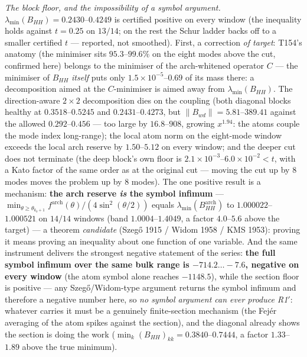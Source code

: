 \documentclass[11pt,a4paper]{article}
\begin{document}
\emph{The block floor, and the impossibility of a symbol argument.}
$\lambda_{\min}(B_{HH})=0.2430$--$0.4249$ is certified positive on every window (the
inequality holds against $t=0.25$ on $13/14$; on the rest the Schur ladder backs off to a
smaller certified $t$ --- reported, not smoothed). First, a correction \emph{of target}:
T154's anatomy (the minimiser sits $95.3$--$99.6\%$ on the eight modes above the cut,
confirmed here) belongs to the minimiser of the arch-whitened operator $C$ --- the
minimiser of $B_{HH}$ \emph{itself} puts only $1.5\times10^{-5}$--$0.69$ of its mass there:
a decomposition aimed at the $C$-minimiser is aimed away from $\lambda_{\min}(B_{HH})$.
The direction-aware $2\times2$ decomposition dies on the coupling (both diagonal blocks
healthy at $0.3518$--$0.5245$ and $0.2431$--$0.4273$, but
$\|B_{wd}\|=5.81$--$389.41$ against the allowed $0.292$--$0.456$ --- too large by
$16.8$--$908$, growing $x^{1.94}$: the atoms couple the mode index long-range); the local
atom norm on the eight-mode window exceeds the local arch reserve by $1.50$--$5.12$ on
every window; and the deeper cut does not terminate (the deep block's own floor is
$2.1\times10^{-3}$--$6.0\times10^{-2}<t$, with a Kato factor of the same order as at the
original cut --- moving the cut up by $8$ modes moves the problem up by $8$ modes). The one
positive result is a mechanism: \textbf{the arch reserve \emph{is} the symbol infimum} ---
$\min_{\theta\ge\theta_{k_b+1}}f^{\mathrm{arch}}(\theta)/(4\sin^2(\theta/2))$ equals
$\lambda_{\min}(B^{\mathrm{arch}}_{HH})$ to $1.000022$--$1.000521$ on $14/14$ windows (band
$1.0004$--$1.4049$, a factor $4.0$--$5.6$ above the target) --- a theorem \emph{candidate}
(Szeg\H{o} 1915 / Widom 1958 / KMS 1953): proving it means proving an inequality about one
function of one variable. And the same instrument delivers the strongest negative
statement of the series: \textbf{the full symbol infimum over the same bulk range is
$-714.2\ldots-7.6$, negative on every window} (the atom symbol alone reaches $-1148.5$),
while the section floor is positive --- any Szeg\H{o}/Widom-type argument returns the
symbol infimum and therefore a negative number here, so \emph{no symbol argument can ever
produce R1$'$}: whatever carries it must be a genuinely finite-section mechanism (the
Fej\'er averaging of the atom spikes against the section), and the diagonal already shows
the section is doing the work ($\min_k(B_{HH})_{kk}=0.3840$--$0.7444$, a factor
$1.33$--$1.89$ above the true minimum).
\end{document}
